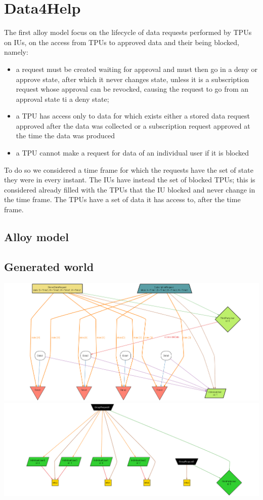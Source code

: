 \section{Data4Help}
The first alloy model focus on the lifecycle of data requests performed by TPUs on IUs, on the access from TPUs to approved data and their being blocked, namely:
\begin{itemize}
\item a request must be created waiting for approval and must then go in a deny or approve state, after which it never changes state, unless it is a subscription request whose approval can be revocked, causing the request to go from an approval state ti a deny state;
\item a TPU has access only to data for which exists either a stored data request approved after the data was collected or a subscription request approved at the time the data was produced
\item a TPU cannot make a request for data of an individual user if it is blocked
\end{itemize}
To do so we considered a time frame for which the requests have the set of state they were in every instant. 
The IUs have instead the set of blocked TPUs; this is considered already filled with the TPUs that the IU blocked and never change in the time frame.
The TPUs have a set of data it has access to, after the time frame.
\subsection{Alloy model}

\subsection{Generated world}
\includegraphics[width = 0.8\textheight, angle=90]{sections/alloy/GenWorldD4H.png}
\includegraphics[width = 0.8\textheight, angle=90]{sections/alloy/GenWorldD4H-2.png}
